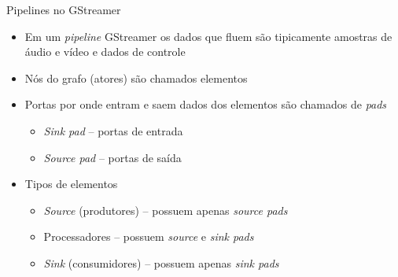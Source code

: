 \documentclass{beamer}
\def\en#1{\foreignlanguage{english}{\emph{#1}}}
\begin{document}
\begin{frame}[c]{Pipelines no GStreamer}
  \begin{itemize}
    \item Em um \en{pipeline} GStreamer os dados que fluem são tipicamente
      amostras de áudio e vídeo e dados de controle
    \item Nós do grafo (atores) são chamados elementos
    \item Portas por onde entram e saem dados dos elementos são chamados de
      \en{pads}
      \begin{itemize}
        \item \en{Sink pad} -- portas de entrada 
        \item \en{Source pad} -- portas de saída 
      \end{itemize}
    \item Tipos de elementos
      \begin{itemize}
        \item \en{Source} (produtores) -- possuem apenas \en{source pads}
        \item Processadores -- possuem \en{source} e \en{sink pads}
        \item \en{Sink} (consumidores) -- possuem apenas \en{sink pads}
      \end{itemize}
  \end{itemize}
\end{frame}
\end{document}
